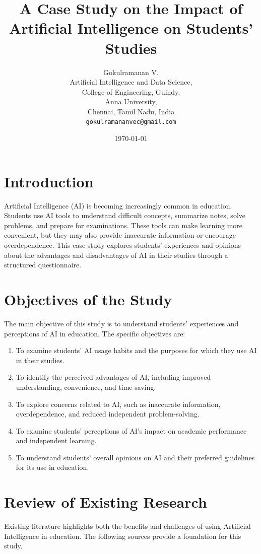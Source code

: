 \documentclass[12pt,a4paper]{article}
\title{\textbf{A Case Study on the Impact of Artificial Intelligence on Students' Studies}}
\author{
    Gokulramanan V.\\
    Artificial Intelligence and Data Science,\\
    College of Engineering, Guindy,\\
    Anna University,\\
    Chennai, Tamil Nadu, India\\
    \texttt{gokulramananvec@gmail.com}
}
\date{\today}
\begin{document}
\maketitle
\section{Introduction}

Artificial Intelligence (AI) is becoming increasingly common in education. Students use AI tools to understand difficult concepts, summarize notes, solve problems, and prepare for examinations. These tools can make learning more convenient, but they may also provide inaccurate information or encourage overdependence. This case study explores students' experiences and opinions about the advantages and disadvantages of AI in their studies through a structured questionnaire.

\section{Objectives of the Study}

The main objective of this study is to understand students' experiences and perceptions of AI in education. The specific objectives are:

\begin{enumerate}
    \item To examine students' AI usage habits and the purposes for which they use AI in their studies.
    \item To identify the perceived advantages of AI, including improved understanding, convenience, and time-saving.
    \item To explore concerns related to AI, such as inaccurate information, overdependence, and reduced independent problem-solving.
    \item To examine students' perceptions of AI's impact on academic performance and independent learning.
    \item To understand students' overall opinions on AI and their preferred guidelines for its use in education.
\end{enumerate}

\section{Review of Existing Research}

Existing literature highlights both the benefits and challenges of using Artificial Intelligence in education. The following sources provide a foundation for this study.
\end{document}
